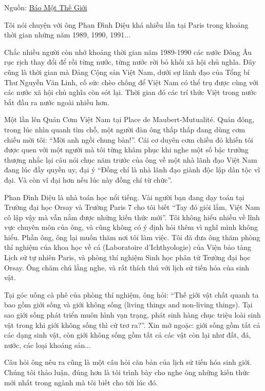 Nguồn: \href{https://1thegioi.vn/giao-su-phan-dinh-dieu-nhu-toi-biet-15579.html}{Báo Một Thế Giới}

Tôi nói chuyện với ông Phan Đình Diệu khá nhiều lần tại Paris trong khoảng thời gian những năm 1989, 1990, 1991...

Chắc nhiều người còn nhớ khoảng thời gian năm 1989-1990 các nước Đông Âu rục rịch thay đổi để rồi từng nước, từng nước rời bỏ khối xã hội chủ nghĩa. Đây cũng là thời gian mà Đảng Cộng sản Việt Nam, dưới sự lãnh đạo của Tổng bí Thư Nguyễn Văn Linh, cố sức chèo chống để Việt Nam có thể trụ được cùng với các nước xã hội chủ nghĩa còn sót lại. Thời gian đó các trí thức Việt trong nước bắt đầu ra nước ngoài nhiều hơn.

Một lần lên Quán Cơm Việt Nam tại Place de Maubert-Mutualité. Quán đông, trong lúc nhìn quanh tìm chỗ, một người đàn ông thấp thấp đang dùng cơm chiều mời tôi: “Mời anh ngồi chung bàn!”. Cái cơ duyên cơm chiều đó khiến tôi được quen với một người mà tôi từng khâm phục khi nghe một số bậc trưởng thượng nhắc lại câu nói chục năm trước của ông về một nhà lãnh đạo Việt Nam đang lúc đầy quyền uy, đại ý “Đồng chí là nhà lãnh đạo giành độc lập dân tộc vĩ đại. Và còn vĩ đại hơn nếu lúc này đồng chí từ chức”.

Phan Đình Diệu là nhà toán học nổi tiếng. Vài người bạn đang dạy toán tại Trường đại học Orsay và Trường Paris 7 cho tôi biết “Tay đó giỏi lắm, Việt Nam cô lập vậy mà vẫn nắm được những kiến thức mới”. Tôi không hiểu nhiều về lĩnh vực chuyên môn của ông, và cũng không có ý định hỏi thêm vì nghĩ mình không hiểu. Phần ông, ông lại muốn thăm nơi tôi làm việc. Tôi đã đưa ông thăm phòng thí nghiệm của khoa học về cá (Laboratoire d’Ichthyologie) của Viện bảo tàng Lịch sử tự nhiên Paris, và phòng thí nghiệm Sinh học phân tử Trường đại học Orsay. Ông chăm chú lắng nghe, và rất thích thú với lịch sử tiến hóa của sinh vật.

Tại góc uống cà phê của phòng thí nghiệm, ông hỏi: “Thế giới vật chất quanh ta bao gồm giới sống và giới không sống (living things and non-living things). Tại sao giới sống phát triển muôn hình vạn trạng, phát sinh hàng chục triệu loài sinh vật trong khi giới không sống thì cứ trơ ra?”. Xin mở ngoặc: giới sống gồm tất cả các dạng sinh vật, còn giới không sống gồm tất cả các vật còn lại như đất, đá, nước, các loại khoáng sản...

Câu hỏi ông nêu ra cũng là một câu hỏi căn bản của lịch sử tiến hóa sinh giới. Chúng tôi thảo luận, đúng hơn là tôi trình bày cho nghe ông những kiến thức mới nhất trong ngành mà tôi biết cho tới lúc đó.

